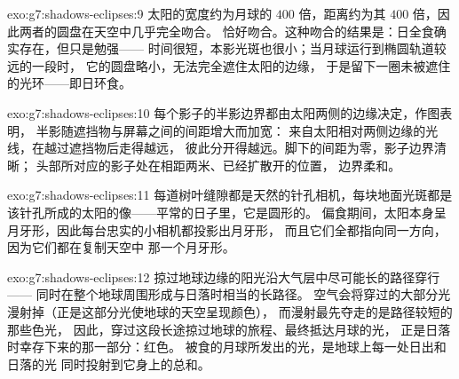 \begin{solution}{exo:g7:shadows-eclipses:9}
太阳的宽度约为月球的 $400$ 倍，距离约为其
$400$ 倍，因此两者的圆盘在天空中几乎完全吻合。
恰好吻合。这种吻合的结果是：日全食确实存在，但只是勉强——
时间很短，本影光斑也很小；当月球运行到椭圆轨道较远的一段时，
它的圆盘略小，无法完全遮住太阳的边缘，
于是留下一圈未被遮住的光环——即日环食。
\end{solution}

\begin{solution}{exo:g7:shadows-eclipses:10}
每个影子的半影边界都由太阳两侧的边缘决定，作图表明，
半影随遮挡物与屏幕之间的间距增大而加宽：
来自太阳相对两侧边缘的光线，在越过遮挡物后走得越远，
彼此分开得越远。脚下的间距为零，影子边界清晰；
头部所对应的影子处在相距两米、已经扩散开的位置，
边界柔和。
\end{solution}

\begin{solution}{exo:g7:shadows-eclipses:11}
每道树叶缝隙都是天然的针孔相机，每块地面光斑都是
该针孔所成的太阳的像——平常的日子里，它是圆形的。
偏食期间，太阳本身呈月牙形，因此每台忠实的小相机都投影出月牙形，
而且它们全都指向同一方向，因为它们都在复制天空中
那一个月牙形。
\end{solution}

\begin{solution}{exo:g7:shadows-eclipses:12}
掠过地球边缘的阳光沿大气层中尽可能长的路径穿行——
同时在整个地球周围形成与日落时相当的长路径。
空气会将穿过的大部分光漫射掉（正是这部分光使地球的天空呈现颜色），
而漫射最先夺走的是路径较短的那些色光，
因此，穿过这段长途掠过地球的旅程、最终抵达月球的光，
正是日落时幸存下来的那一部分：红色。
被食的月球所发出的光，是地球上每一处日出和日落的光
同时投射到它身上的总和。
\end{solution}

